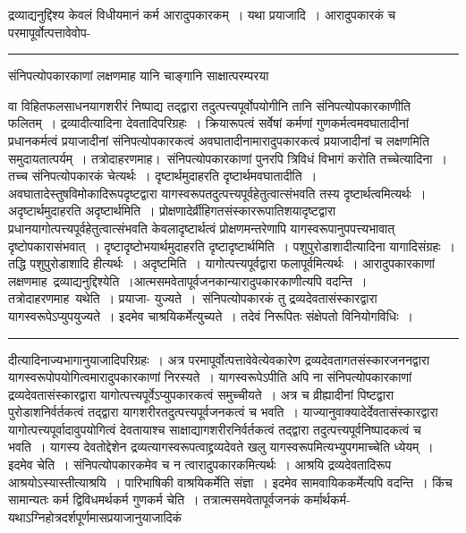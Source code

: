 \documentclass[11pt, openany]{book}
\newcommand\alfootnote[1]{%
  \begingroup
  \renewcommand\thefootnoteA{}\footnoteA{#1}%
  \addtocounter{footnoteA}{-1}%
  \endgroup
}
\begin{document}
{\bl द्रव्याद्यनुद्दिश्य केवलं विधीयमानं कर्म आरादुपकारकम्~। यथा प्रयाजादि~। आरादुपकारकं च परमापूर्वोत्पत्तावेवोप-\\}
\hrule
\vspace{3mm}
\noindent
संनिपत्योपकारकाणां लक्षणमाह यानि चाङ्गानि साक्षात्परम्परया\alfootnote{टिप्प०\textemdash\ $^{1}$निष्पाद्येत्यत्रत्यं निष्पादनान्वयि~।}\footnotemarkA[1] वा विहितफलसाधनयागशरीरं निष्पाद्य तद्द्वारा तदुत्पत्त्यपूर्वोपयोगीनि तानि संनिपत्योपकारकाणीति फलितम्~। द्रव्यादीत्यादिना देवतादिपरिग्रहः~। क्रियारूपत्वं सर्वेषां कर्मणां गुणकर्मत्वमवघातादीनां प्रधानकर्मत्वं प्रयाजादीनां संनिपत्योपकारकत्वं अवघातादीनामारादुपकारकत्वं प्रयाजादीनां च लक्षणमिति समुदायतात्पर्यम्~। तत्रोदाहरणमाह।~संनिपत्योपकारकाणां पुनरपि त्रिविधं विभागं करोति {\br तच्चेत्यादिना~।} तच्च संनिपत्योपकारकं चेत्यर्थः~। दृष्टार्थमुदाहरति {\br दृष्टार्थमवघातादीति~।} अवघातादेस्तुषविमोकादिरूपदृष्टद्वारा यागस्वरूपतदुत्पत्त्यपूर्वहेतुत्वात्संभवति तस्य दृष्टार्थत्वमित्यर्थः~। अदृष्टार्थमुदाहरति {\br अदृष्टार्थमिति~।} प्रोक्षणादेर्व्रीहिगतसंस्काररूपातिशयादृष्टद्वारा प्रधानयागोत्पत्त्यपूर्वहेतुत्वात्संभवति केवलादृष्टार्थत्वं
प्रोक्षणमन्तरेणापि यागस्वरूपानुपपत्त्यभावात् दृष्टोपकारासंभवात्~। दृष्टादृष्टोभयार्थमुदाहरति {\br दृष्टादृष्टार्थमिति~।} पशुपुरोडाशादीत्यादिना यागादिसंग्रहः~। {\br तद्धि} पशुपुरोडाशादि हीत्यर्थः~। {\br अदृष्टमिति~।} यागोत्पत्त्यपूर्वद्वारा फलापूर्वमित्यर्थः~।
 आरादुपकारकाणां लक्षणमाह\textendash\ {\br द्रव्याद्यनुद्दिश्येति~।}आत्मसमवेतापूर्वजनकान्यारादुपकारकाणीत्यपि वदन्ति~। तत्रोदाहरणमाह\textendash\ {\br यथेति~।} प्रयाजा-
\newpage
\fancyhead[LO]{कारकाणि ]}
{\bl\noindent युज्यते~।~संनिपत्योपकारकं तु द्रव्यदेवतासंस्कारद्वारा यागस्वरूपेऽप्युपयुज्यते~। इदमेव चाश्रयिकर्मेत्युच्यते~। तदेवं निरूपितः संक्षेपतो विनियोगविधिः~।}\\
\hrule
\vspace{3mm}
\noindent
दीत्यादिनाज्यभागानुयाजादिपरिग्रहः~। अत्र परमापूर्वोत्पत्तावेवेत्येवकारेण द्रव्यदेवतागतसंस्कारजननद्वारा यागस्वरूपोपयोगित्वमारादुपकारकाणां निरस्यते~। यागस्वरूपेऽपीति {\qt अपि} ना संनिपत्योपकारकाणां द्रव्यदेवतासंस्कारद्वारा यागोत्पत्त्यपूर्वेऽप्युपकारकत्वं समुच्चीयते~। अत्र च व्रीह्यादीनां पिष्टद्वारा पुरोडाशनिर्वर्तकत्वं तद्द्वारा यागशरीरतदुत्पत्त्यपूर्वजनकत्वं च भवति~। याज्यानुवाक्यादेर्देवतासंस्कारद्वारा यागोत्पत्त्यपूर्वादावुपयोगित्वं देवतायाश्च साक्षाद्यागशरीरनिर्वर्तकत्वं तद्द्वारा
तदुत्पत्त्यपूर्वनिष्पादकत्वं च भवति~। यागस्य देवतोद्देशेन द्रव्यत्यागस्वरूपत्वाद्द्रव्यदेवते खलु यागस्वरूपमित्यभ्युपगमाच्चेति ध्येयम्~। {\br इदमेव चेति~।} संनिपत्योपकारकमेव च न त्वारादुपकारकमित्यर्थः~। {\br आश्रयि} द्रव्यदेवतादिरूप आश्रयोऽस्यास्तीत्याश्रयि~। पारिभाषिकी वाश्रयिकर्मेति संज्ञा~। इदमेव सामवायिककर्मेत्यपि वदन्ति~। किंच सामान्यतः कर्म द्विविधमर्थकर्म गुणकर्म चेति~। तत्रात्मसमवेतापूर्वजनकं कर्मार्थकर्म-यथाऽग्निहोत्रदर्शपूर्णमासप्रयाजानुयाजादिकं
\end{document}
